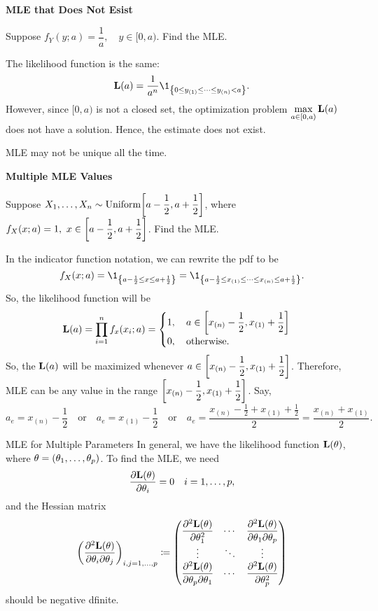 \begin{eg}
	\textbf{MLE that Does Not Esist}
	\par Suppose $f_Y(y;a)=\dfrac{1}{a},\quad y\in[0, a)$. Find the MLE.
	\begin{sol}
		The likelihood function is the same: \[\L(a)=\dfrac{1}{a^n}\1_{\qty{0\leq y_{(1)}\leq\cdots\leq y_{(n)}<a}}.\] However, since $[0,a)$ is not a closed set, the optimization problem $\displaystyle\max_{a\in[0,a)}\vb{L}(a)$ does not have a solution. Hence, the estimate does not exist. 
	\end{sol}
\end{eg}
\begin{rmk}
	MLE may not be unique all the time.	
\end{rmk}
\begin{eg}
	\textbf{Multiple MLE Values}
	\par Suppose  $X_1,\dots,X_n\sim\text{Uniform}\qty[a-\dfrac{1}{2},a+\dfrac{1}{2}]$, where $f_X(x;a)=1,\ x\in\qty[a-\dfrac{1}{2}, a+\dfrac{1}{2}]$. Find the MLE. 
	\begin{sol}
		In the indicator function notation, we can rewrite the pdf to be \[f_X(x;a)=\1_{\qty{a-\frac{1}{2}\leq x\leq a+\frac{1}{2}}}=\1_\qty{a-\frac{1}{2}\leq x_{(1)}\leq\cdots\leq x_{(n)}\leq a+\frac{1}{2}}.\] So, the likelihood function will be \[\vb{L}(a)=\prod_{i=1}^nf_x(x_i;a)=\begin{cases}1,\quad a\in\qty[x_{(n)}-\dfrac{1}{2}, x_{(1)}+\dfrac{1}{2}]\\0,\quad \text{otherwise}.\end{cases}\] So, the $\vb{L}(a)$ will be maximized whenever $a\in\qty[x_{(n)}-\dfrac{1}{2}, x_{(1)}+\dfrac{1}{2}]$. Therefore, MLE can be any value in the range $\qty[x_{(n)}-\dfrac{1}{2}, x_{(1)}+\dfrac{1}{2}]$. Say, \[a_e=x_{(n)}-\dfrac{1}{2}\quad\text{or}\quad a_e=x_{(1)}-\frac{1}{2}\quad\text{or}\quad a_e=\dfrac{x_{(n)}-\frac{1}{2}+x_{(1)}+\frac{1}{2}}{2}=\dfrac{x_{(n)}+x_{(1)}}{2}.\]
	\end{sol}
\end{eg}
\begin{thm}{MLE for Multiple Parameters}
	In general, we have the likelihood function $\vb{L}(\theta)$, where $\theta=\qty(\theta_1,\dots,\theta_p)$. To find the MLE, we need \[\pdv{\vb{L}(\theta)}{\theta_i}=0\quad i=1,\dots,p,\] and the Hessian matrix \[\mqty(\dsst\pdv[2]{\L(\theta)}{\theta_i}{\theta_j})_{i,j=1,\dots,p}\coloneqq\mqty(\dsst\pdv[2]{\L(\theta)}{\theta_1}&\cdots&\dsst\pdv[2]{\L(\theta)}{\theta_1}{\theta_p}\\\vdots&\ddots&\vdots\\\dsst\pdv[2]{\L(\theta)}{\theta_p}{\theta_1}&\cdots&\dsst\pdv[2]{\L(\theta)}{\theta_p})\] should be negative dfinite. 
\end{thm}
